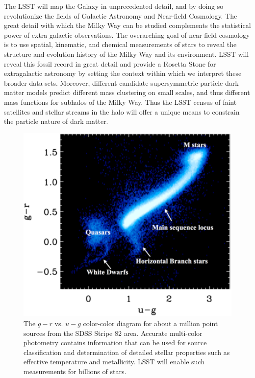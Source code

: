 The LSST will map the Galaxy in unprecedented detail, and by doing so revolutionize the fields of Galactic
Astronomy and Near-field Cosmology. The great detail with which the Milky Way can be studied complements
the statistical power of extra-galactic observations.  The overarching goal of near-field cosmology is to use
spatial, kinematic, and chemical measurements of stars to reveal the structure and evolution history of the Milky Way
and its environment. LSST will reveal this fossil record in great detail and provide a Rosetta Stone for extragalactic
astronomy by setting the context within which we interpret these
broader data sets. Moreover, different candidate supersymmetric
particle dark matter models predict different mass clustering on small
scales, and thus different mass functions for subhalos of the Milky
Way.  Thus the LSST census of faint satellites and stellar streams in
the halo will offer a unique means to constrain the
particle nature of dark matter.


\begin{figure}
\includegraphics[width=1.0\hsize,clip]{MarlaUGR}
\caption{The $g-r$ vs. $u-g$ color-color diagram for about a million point sources
from the SDSS Stripe 82 area. Accurate multi-color photometry
contains information that can be used for source classification and determination of
detailed stellar properties such as effective temperature and metallicity. LSST will
enable such measurements for billions of stars.}
\label{Fig:FeH}
\end{figure}



